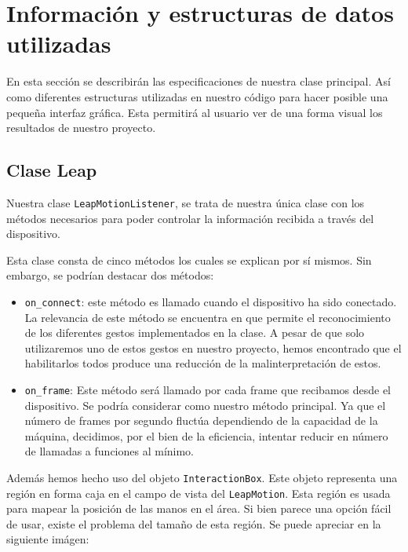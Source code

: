 \documentclass[11pt,a4paper]{article}
\begin{document}
\section{Información y estructuras de datos utilizadas}

En esta sección se describirán las especificaciones de nuestra clase principal. Así como diferentes estructuras utilizadas en nuestro código
para hacer posible una pequeña interfaz gráfica. Esta permitirá al usuario ver de una forma visual los resultados de nuestro proyecto.

\subsection{Clase Leap}

Nuestra clase \texttt{LeapMotionListener}, se trata de nuestra única clase con los métodos necesarios para poder controlar la información recibida
a través del dispositivo.

Esta clase consta de cinco métodos los cuales se explican por sí mismos. Sin embargo, se podrían destacar dos métodos:

\begin{itemize}[label=\textbullet]
	\item \texttt{on\_connect}: este método es llamado cuando el dispositivo ha sido conectado.
	La relevancia de este método se encuentra en que permite el reconocimiento de los diferentes gestos implementados en la clase. A pesar de que solo
	utilizaremos uno de estos gestos en nuestro proyecto, hemos encontrado que el habilitarlos todos produce una reducción de la malinterpretación de estos.
	\item \texttt{on\_frame}: Este método será llamado por cada frame que recibamos desde el dispositivo.
	Se podría considerar como nuestro método principal. Ya que el número de frames por segundo fluctúa dependiendo de la capacidad de la máquina,
	decidimos, por el bien de la eficiencia, intentar reducir en número de llamadas a funciones al mínimo.
\end{itemize}


Además hemos hecho uso del objeto \texttt{InteractionBox}. Este objeto representa una región en forma caja en el campo de vista del \texttt{LeapMotion}.
Esta región es usada para mapear la posición de las manos en el área. Si bien parece una opción fácil de usar, existe el problema del tamaño de esta
región. Se puede apreciar en la siguiente imágen:
\end{document}
